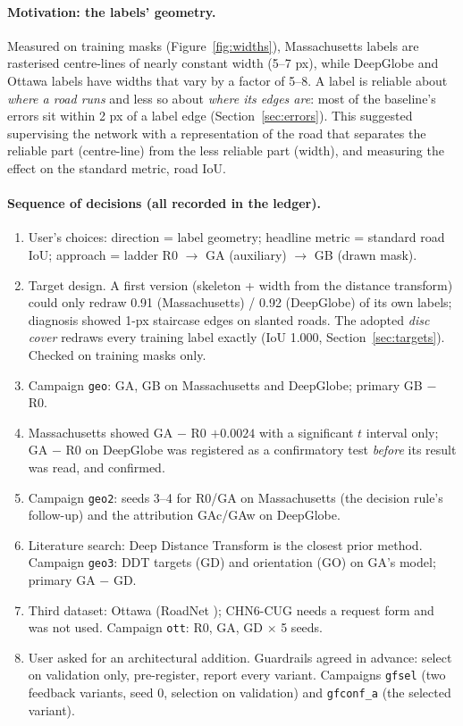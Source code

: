 \documentclass[11pt]{article}
\begin{document}
\paragraph{Motivation: the labels' geometry.} Measured on training masks (Figure~\ref{fig:widths}),
Massachusetts labels are rasterised centre-lines of nearly constant width (5--7 px), while DeepGlobe
and Ottawa labels have widths that vary by a factor of 5--8. A label is reliable about \emph{where a
road runs} and less so about \emph{where its edges are}: most of the baseline's errors sit within
2 px of a label edge (Section~\ref{sec:errors}). This suggested supervising the network with a
representation of the road that separates the reliable part (centre-line) from the less reliable
part (width), and measuring the effect on the standard metric, road IoU.

\paragraph{Sequence of decisions (all recorded in the ledger).}
\begin{enumerate}
  \item User's choices: direction = label geometry; headline metric = standard road IoU; approach =
        ladder R0 $\to$ GA (auxiliary) $\to$ GB (drawn mask).
  \item Target design. A first version (skeleton + width from the distance transform) could only
        redraw 0.91 (Massachusetts) / 0.92 (DeepGlobe) of its own labels; diagnosis showed 1-px
        staircase edges on slanted roads. The adopted \emph{disc cover} redraws every training label
        exactly (IoU 1.000, Section~\ref{sec:targets}). Checked on training masks only.
  \item Campaign \texttt{geo}: GA, GB on Massachusetts and DeepGlobe; primary GB $-$ R0.
  \item Massachusetts showed GA $-$ R0 $+0.0024$ with a significant $t$ interval only; GA $-$ R0 on
        DeepGlobe was registered as a confirmatory test \emph{before} its result was read, and
        confirmed.
  \item Campaign \texttt{geo2}: seeds 3--4 for R0/GA on Massachusetts (the decision rule's
        follow-up) and the attribution GAc/GAw on DeepGlobe.
  \item Literature search: Deep Distance Transform \cite{wang2020ddt} is the closest prior method.
        Campaign \texttt{geo3}: DDT targets (GD) and orientation (GO) on GA's model; primary GA $-$ GD.
  \item Third dataset: Ottawa (RoadNet \cite{liu2019roadnet}); CHN6-CUG \cite{zhu2021chn6} needs a
        request form and was not used. Campaign \texttt{ott}: R0, GA, GD $\times$ 5 seeds.
  \item User asked for an architectural addition. Guardrails agreed in advance: select on
        validation only, pre-register, report every variant. Campaigns \texttt{gfsel} (two feedback
        variants, seed 0, selection on validation) and \texttt{gfconf\_a} (the selected variant).
\end{enumerate}
\end{document}
